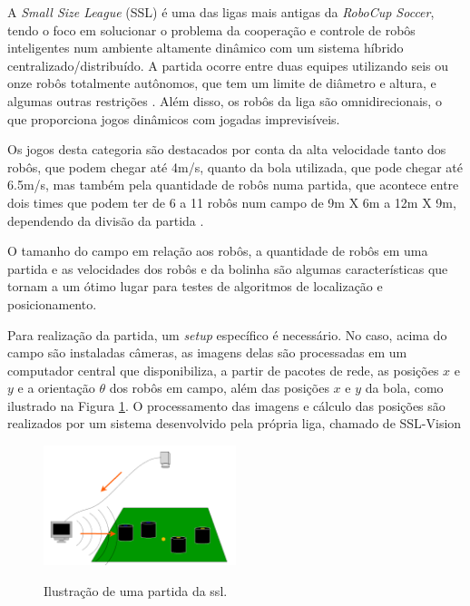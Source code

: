 \documentclass[acronym, symbols, table]{fei}
\begin{document}
		A \textit{Small Size League} (SSL) é uma das ligas mais antigas da \textit{RoboCup Soccer}, tendo o foco em solucionar o problema da cooperação e controle de robôs inteligentes num ambiente altamente dinâmico com um sistema híbrido centralizado/distribuído. A partida ocorre entre duas equipes utilizando seis ou onze robôs totalmente autônomos, que tem um limite de diâmetro e altura, e algumas outras restrições \cite{RoboCup}. Além disso, os robôs da liga são omnidirecionais, o que proporciona jogos dinâmicos com jogadas imprevisíveis.
		
		Os jogos desta categoria são destacados por conta da alta velocidade tanto dos robôs, que podem chegar até 4m/s, quanto da bola utilizada, que pode chegar até 6.5m/s, mas também pela quantidade de robôs numa partida, que acontece entre dois times que podem ter de 6 a 11 robôs num campo de 9m X 6m a 12m X 9m, dependendo da divisão da partida \cite{rules}.
		
		O tamanho do campo em relação aos robôs, a quantidade de robôs em uma partida e as velocidades dos robôs e da bolinha são algumas características que tornam a  um ótimo lugar para testes de algoritmos de localização e posicionamento.
		
		Para realização da partida, um \textit{setup} específico é necessário. No caso, acima do campo são instaladas câmeras, as imagens delas são processadas em um computador central que disponibiliza, a partir de pacotes de rede, as posições $x$ e $y$ e a orientação $\theta$ dos robôs em campo, além das posições $x$ e $y$ da bola, como ilustrado na Figura \ref{fig:ilustracao_partida_ssl}. O processamento das imagens e cálculo das posições são realizados por um sistema desenvolvido pela própria liga, chamado de SSL-Vision \cite{10.1007/978-3-642-11876-0_37}
		
		\begin{figure}[!htb]
			\centering
			\caption{Ilustração de uma partida da \acrshort{ssl}.} 
			\includegraphics[width=0.5\textwidth]{funcionamento_ssl.png}
			\label{fig:ilustracao_partida_ssl}
		\end{figure}
		
\end{document}

